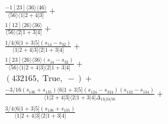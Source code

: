 \documentclass[varwidth, border=5pt]{standalone}
\begin{document}
\begin{my}
$\begin{gathered}
\scriptscriptstyle\frac{-1[23]⟨36⟩⟨46⟩}{⟨56⟩⟨1|2+4|3]}+\\
\scriptscriptstyle\frac{1[12]⟨26⟩⟨36⟩}{⟨56⟩⟨2|1+3|4]}+\\
\scriptscriptstyle\frac{1/4⟨6|1+3|5](s_{14}-s_{32})}{⟨1|2+4|3]⟨2|1+3|4]}+\\
\scriptscriptstyle\frac{1[23]⟨26⟩⟨36⟩(s_{14}-s_{32})}{⟨56⟩⟨1|2+4|3]⟨2|1+3|4]}+\\
\scriptscriptstyle(432165,\;\text{True},\;-)+\\
\scriptscriptstyle\frac{-3/16(s_{136}+s_{135})⟨6|1+3|5](s_{124}-s_{324})(s_{132}-s_{134})}{⟨1|2+4|3]⟨2|1+3|4]Δ_{13|24|56}}+\\
\scriptscriptstyle\frac{3/4⟨6|1+3|5](s_{136}+s_{135})}{⟨1|2+4|3]⟨2|1+3|4]}\phantom{+}
\end{gathered}$
\end{my}
\end{document}
